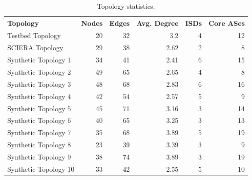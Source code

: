 \begin{table}[h]
    \centering
    \begin{tabular}{lrrrrr}
        \toprule
        Topology & Nodes & Edges & Avg. Degree & ISDs & Core ASes \\
        \midrule
        Testbed Topology & 20 & 32 & 3.2 & 4 & 12 \\
        SCIERA Topology & 29 & 38 & 2.62 & 2 & 8 \\
        Synthetic Topology 1 & 34 & 41 & 2.41 & 6 & 15 \\
        Synthetic Topology 2 & 49 & 65 & 2.65 & 4 & 8 \\
        Synthetic Topology 3 & 48 & 68 & 2.83 & 6 & 16 \\
        Synthetic Topology 4 & 42 & 54 & 2.57 & 5 & 9 \\
        Synthetic Topology 5 & 45 & 71 & 3.16 & 3 & 14 \\
        Synthetic Topology 6 & 40 & 65 & 3.25 & 3 & 13 \\
        Synthetic Topology 7 & 35 & 68 & 3.89 & 5 & 19 \\
        Synthetic Topology 8 & 23 & 39 & 3.39 & 3 & 9 \\
        Synthetic Topology 9 & 38 & 74 & 3.89 & 3 & 19 \\
        Synthetic Topology 10 & 33 & 42 & 2.55 & 5 & 10 \\
        \bottomrule
    \end{tabular}
    \caption{Topology statistics.}
    \label{tab:topology_stats}
\end{table}